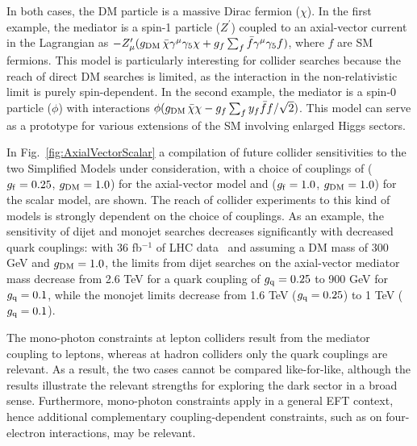 \documentclass[../report.tex]{subfiles}
\begin{document}
In both cases, the DM particle is a massive Dirac fermion ($\chi$). In the first example, the mediator is a spin-1 particle ($Z^\prime$) coupled to an axial-vector current in the Lagrangian as $-Z^\prime_\mu (g_{\rm DM} \, \bar{\chi}\gamma^{\mu}\gamma_5\chi + g_f \sum_{f}  \bar{f}\gamma^{\mu}\gamma_5f )$, where $f$ are SM fermions. This model is particularly interesting for collider searches because the reach of direct DM searches is limited, as the  interaction in the non-relativistic limit is purely spin-dependent.  In the second example, the mediator is a spin-0 particle ($\phi$) with interactions $\phi (g_{\rm DM}\, \bar{\chi}\chi-  g_f   \sum_{f} y_f \bar f f /\sqrt{2})$. This model can serve as a prototype for various extensions of the SM involving enlarged Higgs sectors.

In Fig.~\ref{fig:AxialVectorScalar} a compilation of future collider sensitivities to the two Simplified Models under consideration, with a choice of couplings of ($g_{\rm f}=0.25$, $g_{\rm DM}=1.0$) for the axial-vector model and ($g_{\rm f}=1.0$, $g_{\rm DM}=1.0$) for the scalar model, are shown. The reach of collider experiments to this kind of models is strongly dependent on the choice of couplings. As an example, the sensitivity of dijet and monojet searches decreases significantly with decreased quark couplings: with 36 fb$^{-1}$ of LHC data~\cite{Aaboud:2019yqu} and assuming a DM mass of 300 GeV and $g_{\rm DM}=1.0$, the limits from dijet searches on the axial-vector mediator mass decrease from 2.6 TeV for a quark coupling of $g_{\rm q}=0.25$ to 900 GeV for $g_{\rm q}=0.1$, while the monojet limits decrease from 1.6 TeV ($g_{\rm q}=0.25$) to 1 TeV ($g_{\rm q}=0.1$). 

The mono-photon constraints at lepton colliders result from the mediator coupling to leptons, whereas at hadron colliders only the quark couplings are relevant.  As a result, the two cases cannot be compared like-for-like, although the results illustrate the relevant strengths for exploring the dark sector in a broad sense.  Furthermore, mono-photon constraints apply in a general EFT context, hence additional complementary coupling-dependent constraints, such as on four-electron interactions, may be relevant. 
\end{document}
